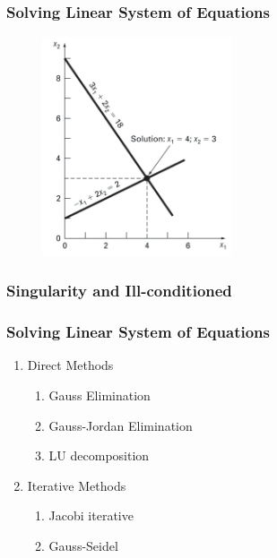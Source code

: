 \documentclass[notes]{beamer}
\begin{document}
\begin{frame}
	\frametitle{Solving Linear System of Equations}
	\begin{figure}[ht]
		\centering
		\includegraphics[width=0.5\textwidth]{figs/graphical-linear-systems.png}
	\end{figure}
\end{frame}

\begin{frame}
	\frametitle{Singularity and Ill-conditioned}
\end{frame}


\begin{frame}
	\frametitle{Solving Linear System of Equations}
	\begin{enumerate}
		\item Direct Methods
		\begin{enumerate}
			\item Gauss Elimination
			\item Gauss-Jordan Elimination
			\item LU decomposition
		\end{enumerate}
		\item Iterative Methods
		\begin{enumerate}
			\item Jacobi iterative
			\item Gauss-Seidel
		\end{enumerate}
	\end{enumerate}
\end{frame}
\end{document}
